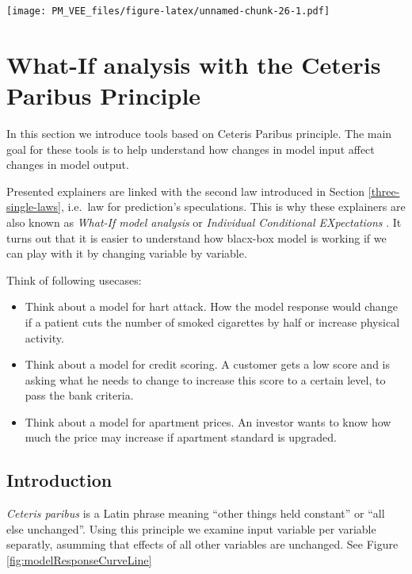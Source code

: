 \documentclass[]{krantz}
\providecommand{\tightlist}{%
  \setlength{\itemsep}{0pt}\setlength{\parskip}{0pt}}
\theoremstyle{definition}
\theoremstyle{definition}
\theoremstyle{definition}
\theoremstyle{remark}
\begin{document}
\texttt{[image: PM\_VEE\_files/figure-latex/unnamed-chunk-26-1.pdf]}

\hypertarget{ceterisParibus}{%
\section{What-If analysis with the Ceteris Paribus
Principle}\label{ceterisParibus}}

In this section we introduce tools based on Ceteris Paribus principle.
The main goal for these tools is to help understand how changes in model
input affect changes in model output.

Presented explainers are linked with the second law introduced in
Section \ref{three-single-laws}, i.e.~law for prediction's speculations.
This is why these explainers are also known as \emph{What-If model
analysis} or \emph{Individual Conditional EXpectations} \citep{ICEbox}.
It turns out that it is easier to understand how blacx-box model is
working if we can play with it by changing variable by variable.

Think of following usecases:

\begin{itemize}
\tightlist
\item
  Think about a model for hart attack. How the model response would
  change if a patient cuts the number of smoked cigarettes by half or
  increase physical activity.
\item
  Think about a model for credit scoring. A customer gets a low score
  and is asking what he needs to change to increase this score to a
  certain level, to pass the bank criteria.
\item
  Think about a model for apartment prices. An investor wants to know
  how much the price may increase if apartment standard is upgraded.
\end{itemize}

\hypertarget{introduction-1}{%
\subsection{Introduction}\label{introduction-1}}

\emph{Ceteris paribus} is a Latin phrase meaning ``other things held
constant'' or ``all else unchanged''. Using this principle we examine
input variable per variable separatly, asumming that effects of all
other variables are unchanged. See Figure
\ref{fig:modelResponseCurveLine}
\end{document}

